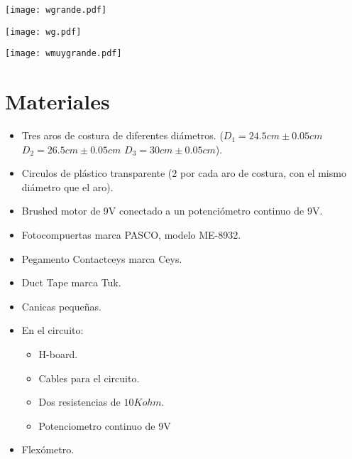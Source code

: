 \documentclass[12p]{article}
\begin{document}
\begin{center}
\texttt{[image: wgrande.pdf]}
\end{center}

\begin{center}
\texttt{[image: wg.pdf]}
\end{center}

\begin{center}
\texttt{[image: wmuygrande.pdf]}
\end{center}

\section{Materiales} 
\begin{itemize}
\item Tres aros de costura de diferentes di\'ametros. ($D_{1}= 24.5 cm \pm 0.05 cm$ $D_{2}= 26.5 cm \pm 0.05 cm$ $D_{3}= 30 cm \pm 0.05 cm$).
\item Circulos de pl\'astico transparente (2 por cada aro de costura, con el mismo di\'ametro que el aro).
\item Brushed motor de 9V conectado a un potenci\'ometro continuo de 9V.
\item Fotocompuertas marca PASCO, modelo ME-8932.
\item Pegamento Contactceys marca Ceys.
\item Duct Tape marca Tuk.
\item Canicas peque\~nas.
\item En el circuito:
	\begin{itemize}
	\item H-board.
	\item Cables para el circuito.
	\item Dos resistencias de $10 Kohm$.
	\item Potenciometro continuo de 9V
	\end{itemize}
\item Flex\'ometro.
\end{itemize}
\end{document}
